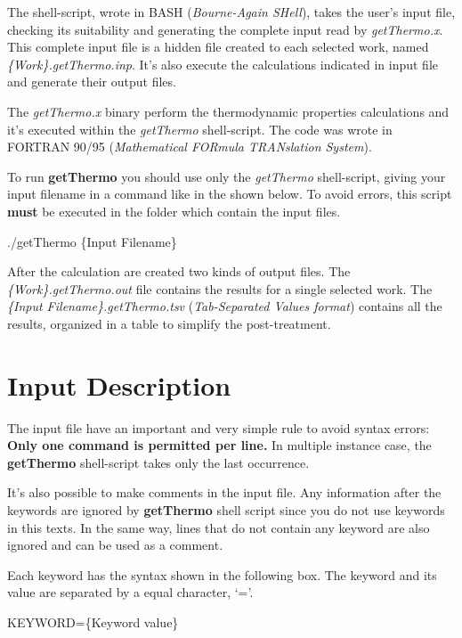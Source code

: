 \documentclass[11pt,oneside,a4paper]{article}
\begin{document}
The shell-script, wrote in BASH (\textit{Bourne-Again SHell}), takes the user's input file, checking its suitability and generating the complete input read by \textit{getThermo.x}. This complete input file is a hidden file created to each selected work, named \textit{\{Work\}.getThermo.inp}. It's also execute the calculations indicated in input file and generate their output files.

The \textit{getThermo.x} binary perform the thermodynamic properties calculations and it's executed within the \textit{getThermo} shell-script. The code was wrote in FORTRAN 90/95 (\textit{Mathematical FORmula TRANslation System}).

To run \textbf{getThermo} you should use only the \textit{getThermo} shell-script, giving your input filename in a command like in the shown below. To avoid errors, this script \textbf{must} be executed in the folder which contain the input files.
\begin{shaded}
./getThermo \{Input Filename\}
\end{shaded}

After the calculation are created two kinds of output files. The \textit{\{Work\}.getThermo.out} file contains the results for a single selected work. The \textit{\{Input Filename\}.getThermo.tsv} (\textit{Tab-Separated Values format}) contains all the results, organized in a table to simplify the post-treatment. 

\pagebreak
\section[Input Description]{Input Description}

The input file have an important and very simple rule to avoid syntax errors: \textbf{Only one command is permitted per line.} In multiple instance case, the \textbf{getThermo} shell-script takes only the last occurrence.

It's also possible to make comments in the input file. Any information after the keywords are ignored by \textbf{getThermo} shell script since you do not use keywords in this texts. In the same way, lines that do not contain any keyword are also ignored and can be used as a comment.

Each keyword has the syntax shown in the following box. The keyword and its value are separated by a equal character, `='.
\begin{shaded}
KEYWORD=\{Keyword value\}
\end{shaded}
\end{document}
